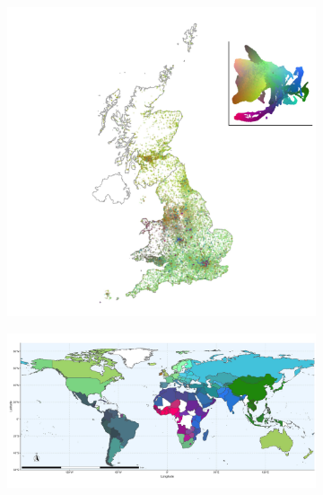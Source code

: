 \documentclass[12pt]{pnas-new}
\begin{document}
\begin{figure}[h!]
  \centering
  \begin{subfigure}[b]{0.4\linewidth}
    \includegraphics[width=\linewidth]{images/UKBB_mapsInMaps_2D3_permute50.jpg}
    \caption{}
    \label{fig:umap_ukbb_geo_map}
  \end{subfigure}
  \begin{subfigure}[b]{0.4\linewidth}
    \includegraphics[width=\linewidth]{images/meanWorldMap.jpg}
    \caption{}
  \label{fig:umap_world_map}
  \end{subfigure}

\end{figure}
\end{document}
